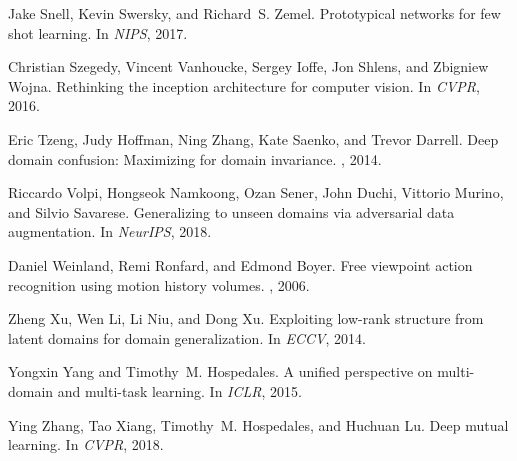\documentclass[10pt,twocolumn,letterpaper]{article}
\begin{document}
{\begin{thebibliography}{10}
Jake Snell, Kevin Swersky, and Richard~S. Zemel.
\newblock Prototypical networks for few shot learning.
\newblock In {\em NIPS}, 2017.

Christian Szegedy, Vincent Vanhoucke, Sergey Ioffe, Jon Shlens, and Zbigniew
  Wojna.
\newblock Rethinking the inception architecture for computer vision.
\newblock In {\em CVPR}, 2016.

Eric Tzeng, Judy Hoffman, Ning Zhang, Kate Saenko, and Trevor Darrell.
\newblock Deep domain confusion: Maximizing for domain invariance.
, 2014.

Riccardo Volpi, Hongseok Namkoong, Ozan Sener, John Duchi, Vittorio Murino, and
  Silvio Savarese.
\newblock Generalizing to unseen domains via adversarial data augmentation.
\newblock In {\em NeurIPS}, 2018.

Daniel Weinland, Remi Ronfard, and Edmond Boyer.
\newblock Free viewpoint action recognition using motion history volumes.
, 2006.

Zheng Xu, Wen Li, Li Niu, and Dong Xu.
\newblock Exploiting low-rank structure from latent domains for domain
  generalization.
\newblock In {\em ECCV}, 2014.

Yongxin Yang and Timothy~M. Hospedales.
\newblock A unified perspective on multi-domain and multi-task learning.
\newblock In {\em ICLR}, 2015.

Ying Zhang, Tao Xiang, Timothy~M. Hospedales, and Huchuan Lu.
\newblock Deep mutual learning.
\newblock In {\em CVPR}, 2018.

\end{thebibliography}

}

\clearpage
\newpage
\appendix

\begin{table}[t]
\centering
{}
\caption{Further evaluation on PACS using ResNet-18.}
\label{appendix:tab:pacs}
\end{table}
\end{document}
